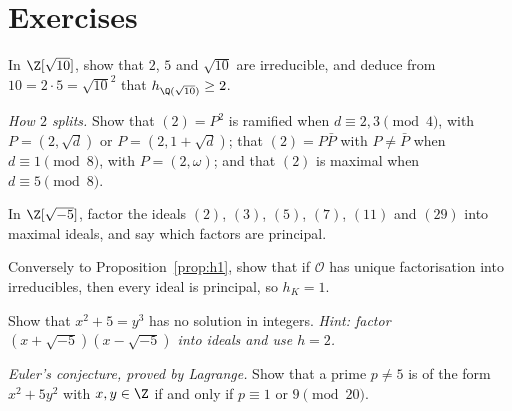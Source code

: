 \section{Exercises}

\begin{exercise}[$\star\star$]\label{ex:sqrt10}
In $\Z[\sqrt{10}]$, show that $2$, $5$ and $\sqrt{10}$ are irreducible, and deduce from $10=2\cdot5=\sqrt{10}^2$ that $h_{\Q(\sqrt{10})}\ge2$.
\end{exercise}

\begin{exercise}[$\star\star$]\label{ex:two}
\emph{How $2$ splits.} Show that $(2)=P^2$ is ramified when $d\equiv2,3\pmod4$, with $P=(2,\sqrt d)$ or $P=(2,1+\sqrt d)$; that $(2)=P\bar P$ with $P\ne\bar P$ when $d\equiv1\pmod8$, with $P=(2,\omega)$; and that $(2)$ is maximal when $d\equiv5\pmod8$.
\end{exercise}

\begin{exercise}[$\star\star$]\label{ex:factor5}
In $\Z[\sqrt{-5}]$, factor the ideals $(2)$, $(3)$, $(5)$, $(7)$, $(11)$ and $(29)$ into maximal ideals, and say which factors are principal.
\end{exercise}

\begin{exercise}[$\star\star$]\label{ex:ufdh1}
Conversely to Proposition~\ref{prop:h1}, show that if $\mathcal O$ has unique factorisation into irreducibles, then every ideal is principal, so $h_K=1$.
\end{exercise}

\begin{exercise}[$\star\star\star$]\label{ex:x2p5}
Show that $x^2+5=y^3$ has no solution in integers. \emph{Hint: factor $(x+\sqrt{-5})(x-\sqrt{-5})$ into ideals and use $h=2$.}
\end{exercise}

\begin{exercise}[$\star\star\star$]\label{ex:fermat5}
\emph{Euler's conjecture, proved by Lagrange.} Show that a prime $p\ne5$ is of the form $x^2+5y^2$ with $x,y\in\Z$ if and only if $p\equiv1$ or $9\pmod{20}$.
\end{exercise}

